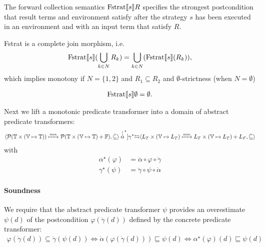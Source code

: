 \documentclass{article}
\newcommand{\Term}{\ensuremath \mathbb{T}}
\newcommand{\Fail}{\ensuremath \mathbb{F}}
\newcommand{\Var}{\ensuremath \mathbb{V}}
\newcommand{\Env}{\ensuremath \Var \mapsto \Term}
\newcommand{\Pow}[1]{\ensuremath \mathcal{P}(#1)}
\newcommand{\Fstrat}[1]{\ensuremath \text{Fstrat}\llbracket #1 \rrbracket}
\newcommand{\mon}{\ensuremath \xmapsto{\text{\tiny mon}}}
\begin{document}
The forward collection semantics $\Fstrat{s}R$ specifies the strongest postcondition that result terms and environment satisfy after the strategy $s$ has been executed in an environment and with an input term that satisfy $R$. 

\noindent
Fstrat is a complete join morphism, i.e.
%
\begin{align*}
  \Fstrat{s}(\bigcup_{k \in N} R_k) = \bigcup_{k \in N}(\Fstrat{s}(R_k)),
\end{align*}
%
which implies monotony if $N = \lbrace 1, 2 \rbrace$ and $R_1 \subseteq R_2$ and $\emptyset$-strictness (when $N = \emptyset$)

\begin{align*}
  \Fstrat{s}\emptyset = \emptyset.
\end{align*}

Next we lift a monotonic predicate transformer into a domain of abstract predicate transformers:
%
\begin{align*}
  \langle \Pow{\Term \times (\Env)} \mon \Pow{\Term \times (\Env) + \Fail}, \dot{\subseteq} \rangle \stackrel[\alpha^\star]{\gamma^\star}{\leftrightarrows}
  \langle L_T \times (\Var \mapsto L_T) \mon L_T \times (\Var \mapsto L_T) + L_F, \dot{\sqsubseteq} \rangle
\end{align*}
%
with
%
\begin{align*}
  \alpha^\star(\varphi) &= \ddot{\alpha} \circ \varphi \circ \dot{\gamma} \\
  \gamma^\star(\psi) &= \ddot{\gamma} \circ \psi \circ \dot{\alpha}
\end{align*}

\begin{center}
\end{center}

\paragraph{Soundness}

We require that the abstract predicate transformer $\psi$ provides an overestimate $\psi(d)$ of the postcondition $\varphi(\ddot{\gamma}(d))$ defined by the concrete predicate transformer:
%
\begin{align*}
  \varphi(\dot{\gamma}(d)) \subseteq \ddot{\gamma}(\psi(d)) \Longleftrightarrow
  \ddot{\alpha}(\varphi(\dot{\gamma}(d))) \sqsubseteq \psi(d) \Longleftrightarrow
  \alpha^\star(\varphi)(d) \sqsubseteq \psi(d)
\end{align*}
\end{document}
